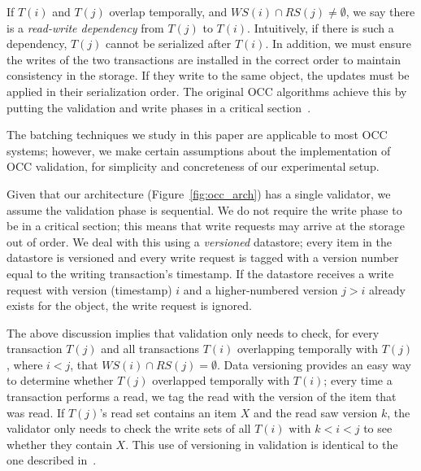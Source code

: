 If $T(i)$ and $T(j)$ overlap temporally, and $WS(i) \cap RS(j) \neq \emptyset$, we say there is a \emph{read-write dependency} from $T(j)$ to $T(i)$. Intuitively, if there is such a dependency, $T(j)$ cannot be serialized after $T(i)$. In addition, we must ensure the writes of the two transactions are installed in the correct order to maintain consistency in the storage. If they write to the same object, the updates must be applied in their serialization order. The original OCC algorithms achieve this by putting the validation and write phases in a critical section~\cite{kung81tods}.

The batching techniques we study in this paper are applicable to most OCC systems; however, we make certain assumptions about the implementation of OCC validation, for simplicity and concreteness of our experimental setup.

Given that our architecture (Figure~\ref{fig:occ_arch}) has a single validator, we assume the validation phase is sequential. We do not require the write phase to be in a critical section; this means that write requests may arrive at the storage out of order. We deal with this using a \emph{versioned} datastore; every item in the datastore is versioned and every write request is tagged with a version number equal to the writing transaction's timestamp. If the datastore receives a write request with version (timestamp) $i$ and a higher-numbered version $j > i$ already exists for the object, the write request is ignored. 

The above discussion implies that validation only needs to check, for every transaction $T(j)$ and all transactions $T(i)$ overlapping temporally with $T(j)$, where $i<j$, that $WS(i) \cap RS(j) = \emptyset$. Data versioning provides an easy way to determine whether $T(j)$ overlapped temporally with $T(i)$; every time a transaction performs a read, we tag the read with the version of the item that was read. If $T(j)$'s read set contains an item $X$ and the read saw version $k$, the validator only needs to check the write sets of all $T(i)$ with $k < i < j$ to see whether they contain $X$. This use of versioning in validation is identical to the one described in~\cite{ding2015centiman}.
